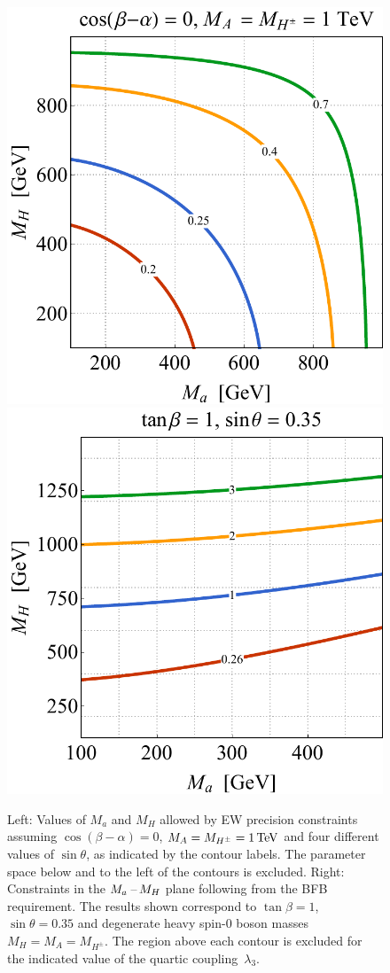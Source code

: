 \documentclass[review]{elsarticle}
\begin{document}
\begin{figure}[t!]
\centering
\includegraphics[height=.45\textwidth]{figure4l.pdf} \qquad 
\includegraphics[height=.45\textwidth]{figure4r.pdf}
\vspace{4mm}
\caption{\label{fig:EWVAC} Left: Values of $M_a$ and $M_H$ allowed by EW precision constraints assuming $\cos(\beta-\alpha)=0$, $M_A= M_{H^\pm}=1 \, {\rm TeV}$ and four different values of $\sin \theta$, as indicated by the contour labels.  The parameter space below and to the left of the contours is excluded. Right: Constraints in the $M_{a}\hspace{0.5mm}$--$\hspace{0.5mm} M_H$ plane following from the  BFB requirement. The  results shown correspond to $\tan \beta = 1$, $\sin \theta = 0.35$ and degenerate heavy spin-0 boson masses $M_H = M_A = M_{H^\pm}$. The region above  each contour  is excluded for the indicated value of the quartic coupling~$\lambda_3$.}  
\end{figure}
\end{document}
